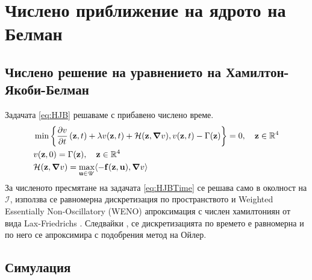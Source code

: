 \section{Числено приближение на ядрото на Белман}
\subsection{Числено решение на уравнението на Хамилтон-Якоби-Белман}
Задачата \eqref{eq:HJB} решаваме с прибавено числено време.
\begin{equation}
  \label{eq:HJBTime}
  \begin{split}
    &\min\left\{\pdv{v}{t}\left(\mathbf{z}, t\right) + \lambda v(\mathbf{z}, t) + \mathcal{H}(\mathbf{z}, \grad{v}), v(\mathbf{z}, t) - \Gamma(\mathbf{z})\right\} = 0, \quad \mathbf{z} \in \mathbb{R}^4 \\
    &v(\mathbf{z}, 0) = \Gamma(\mathbf{z}), \quad \mathbf{z} \in \mathbb{R}^4 \\
    &\mathcal{H}(\mathbf{z}, \grad{v}) = \max_{\mathbf{u} \in \mathscr{U}} \langle -\mathbf{f}(\mathbf{z}, \mathbf{u}), \grad{v} \rangle
  \end{split}
\end{equation}
За численото пресмятане на задачата \eqref{eq:HJBTime} се решава само в околност на $\mathscr{I}$, използва се равномерна дискретизация по пространството и Weighted Essentially Non-Oscillatory (WENO) \cite[3.4]{Osher2003} апроксимация с числен хамилтониян от вида Lax-Friedrichs \cite[5.3]{Osher2003}
. Следвайки \cite[3.5]{Osher2003}, се дискретизацията по времето е равномерна и по него се апроксимира с подобрения метод на Ойлер.

\subsection{Симулация}
